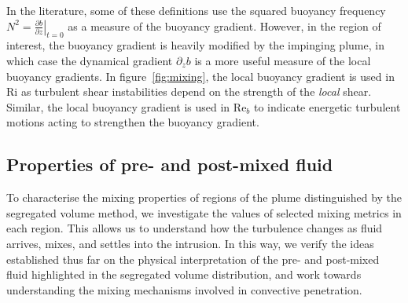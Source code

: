 \documentclass[a4paper]{article}
\begin{document}
In the literature, some of these definitions use the squared buoyancy frequency $N^2 = \left.\frac{\partial
b}{\partial z}\right|_{t=0}$ as a measure of the buoyancy gradient. However, in the region of interest,
the buoyancy gradient is heavily modified by the impinging plume, in which case the dynamical gradient
$\partial_z b$ is a more useful measure of the local buoyancy gradients. In figure~\ref{fig:mixing}, the
local buoyancy gradient is used in $\mathrm{Ri}$ as turbulent shear instabilities depend on the strength of
the \emph{local} shear. Similar, the local buoyancy gradient is used in $\mathrm{Re}_b$ to indicate energetic
turbulent motions acting to strengthen the buoyancy gradient. 

\subsection{Properties of pre- and post-mixed fluid}
To characterise the mixing properties of regions of the plume distinguished by the segregated volume method,
we investigate the values of selected mixing metrics in each region. This allows us to understand how the
turbulence changes as fluid arrives, mixes, and settles into the intrusion. In this way, we verify the ideas
established thus far on the physical interpretation of the pre- and post-mixed fluid highlighted in the
segregated volume distribution, and work towards understanding the mixing mechanisms involved in convective
penetration.
\end{document}
